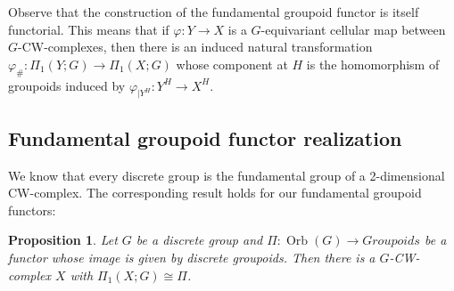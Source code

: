 \documentclass[pdftex]{sigma}
\numberwithin{equation}{section}
\newtheorem{Proposition}[Theorem]{Proposition}
{ \theoremstyle{definition}
	\newtheorem{Definition}[Theorem]{Definition}
	\newtheorem{Note}[Theorem]{Note}
	\newtheorem{Example}[Theorem]{Example}
	\newtheorem{Remark}[Theorem]{Remark} }
\DeclareMathOperator{\Orb}{Orb}
\begin{document}
	Observe that the construction of the fundamental groupoid functor is itself
	functorial. This means that if
	$\varphi\colon Y\to X$ is a $G$-equivariant cellular map between
	$G$-CW-complexes, then there is an induced natural transformation
	$\varphi_{\#}\colon \Pi_1(Y;G)\to \Pi_1(X;G)$
	whose component at $H$ is the homomorphism of groupoids
	induced by ${\varphi_{|Y^H}\colon Y^H\to X^H}$.
	
	\subsection{Fundamental groupoid functor realization}
	
	We know that every discrete group is the fundamental group of a 2-dimensional
	CW-complex. The corresponding result holds for our fundamental groupoid
	functors:
	\begin{Proposition}\label{prop:realize_Pi}
		Let $G$ be a discrete group and $\Pi\colon \Orb(G)\to
		Groupoids$ be a functor whose image is given by discrete groupoids. Then there is a $G$-CW-complex $X$
		with $\Pi_1(X;G) \cong \Pi$.
	\end{Proposition}
\end{document}
